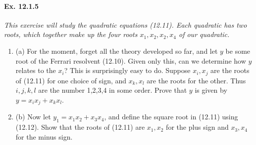 \documentclass[11pt,a4paper]{article}
\newcommand{\be} {\begin{enumerate}}
\newcommand{\ee} {\end{enumerate}}
\begin{document}
\paragraph{Ex. 12.1.5}

{\it This exercise will study the quadratic equations (12.11). Each quadratic has two roots, which together make up the four roots $x_1,x_2,x_2,x_4$ of our quadratic.
\be
\item[(a)] For the moment, forget all the theory developed so far, and let $y$ be some root of the Ferrari resolvent (12.10). Given only this, can we determine how $y$ relates to the $x_i$? This is surprisingly easy to do. Suppose $x_i,x_j$ are the roots of (12.11) for one choice of sign, and $x_k,x_l$ are the roots for the other. Thus $i,j,k,l$ are the number 1,2,3,4 in some order. Prove that $y$ is given by $y=x_ix_j + x_kx_l$.

\item[(b)] Now let $y_1 = x_1x_2 +x_3x_4$, and define the square root in (12.11) using (12.12). Show that the roots of (12.11) are $x_1,x_2$ for the plus sign and $x_3,x_4$ for the minus sign.
\ee
}
\end{document}
